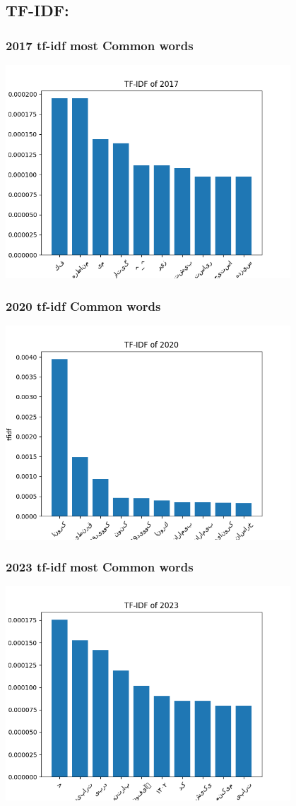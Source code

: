 \documentclass[a4paper]{article}
\begin{document}
\subsection{TF-IDF:}
\subsubsection{2017 tf-idf most Common words}
\includegraphics[width=0.8\textwidth]{../stats/TF-IDF/tfidf17.png}
\subsubsection{2020 tf-idf Common words}
\includegraphics[width=0.8\textwidth]{../stats/TF-IDF/tfidf20.png}
\subsubsection{2023 tf-idf most Common words}
\includegraphics[width=0.8\textwidth]{../stats/TF-IDF/tfidf23.png}
\end{document}
